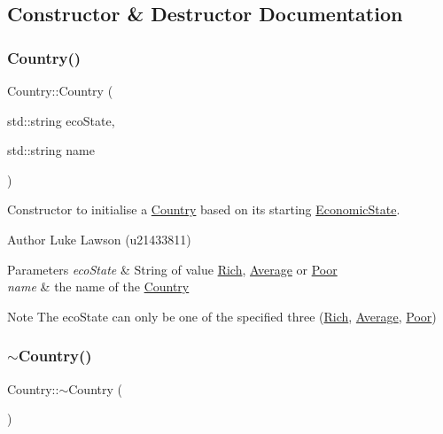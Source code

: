 \subsection{Constructor \& Destructor Documentation}
\mbox{\label{class_country_a04fa29f8caa2b8dcf72b89d43687aa34}} 
\subsubsection{\texorpdfstring{Country()}{Country()}}
{\footnotesize\ttfamily Country\+::\+Country (\begin{DoxyParamCaption}\item[{std\+::string}]{eco\+State,  }\item[{std\+::string}]{name }\end{DoxyParamCaption})}



Constructor to initialise a \mbox{\hyperlink{class_country}{Country}} based on its starting \mbox{\hyperlink{class_economic_state}{Economic\+State}}. 

\begin{DoxyAuthor}{Author}
Luke Lawson (u21433811) 
\end{DoxyAuthor}

\begin{DoxyParams}{Parameters}
{\em eco\+State} & String of value \mbox{\hyperlink{class_rich}{Rich}}, \mbox{\hyperlink{class_average}{Average}} or \mbox{\hyperlink{class_poor}{Poor}} \\
\hline
{\em name} & the name of the \mbox{\hyperlink{class_country}{Country}} \\
\hline
\end{DoxyParams}
\begin{DoxyNote}{Note}
The eco\+State can only be one of the specified three (\mbox{\hyperlink{class_rich}{Rich}}, \mbox{\hyperlink{class_average}{Average}}, \mbox{\hyperlink{class_poor}{Poor}}) 
\end{DoxyNote}
\mbox{\label{class_country_a5013557e0d93fabc976bfa0d7f0564a3}} 
\subsubsection{\texorpdfstring{$\sim$Country()}{~Country()}}
{\footnotesize\ttfamily Country\+::$\sim$\+Country (\begin{DoxyParamCaption}{ }\end{DoxyParamCaption})}



